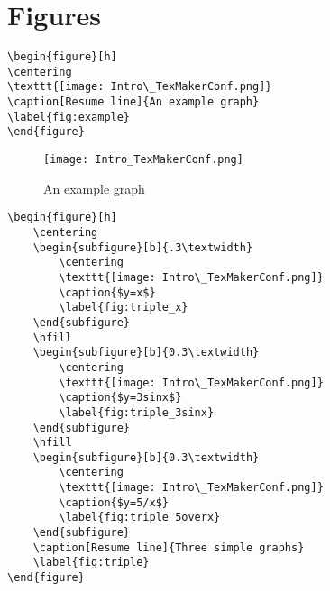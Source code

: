 \section{Figures}\label{sec:Elements_figures}
%
\begin{lstlisting}
\begin{figure}[h]
\centering
\texttt{[image: Intro\_TexMakerConf.png]}
\caption[Resume line]{An example graph}
\label{fig:example}
\end{figure}
\end{lstlisting}

\begin{figure}[h]
\centering
\texttt{[image: Intro\_TexMakerConf.png]}
\caption[Resume line]{An example graph}
\label{fig:example}
\end{figure}

\begin{lstlisting}
\begin{figure}[h]
    \centering
    \begin{subfigure}[b]{.3\textwidth}
        \centering
        \texttt{[image: Intro\_TexMakerConf.png]}
        \caption{$y=x$}
        \label{fig:triple_x}
    \end{subfigure}
    \hfill
    \begin{subfigure}[b]{0.3\textwidth}
        \centering
        \texttt{[image: Intro\_TexMakerConf.png]}
        \caption{$y=3sinx$}
        \label{fig:triple_3sinx}
    \end{subfigure}
    \hfill
    \begin{subfigure}[b]{0.3\textwidth}
        \centering
        \texttt{[image: Intro\_TexMakerConf.png]}
        \caption{$y=5/x$}
        \label{fig:triple_5overx}
    \end{subfigure}
    \caption[Resume line]{Three simple graphs}
    \label{fig:triple}
\end{figure}
\end{lstlisting}

